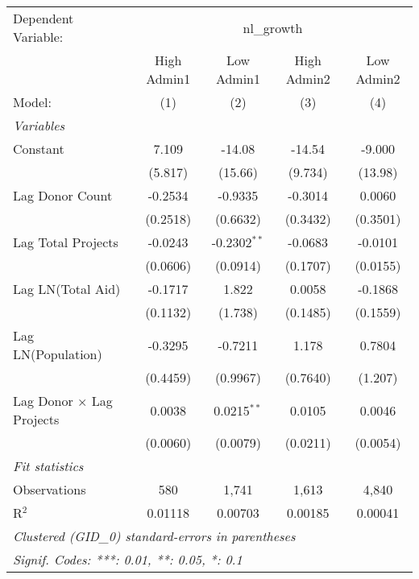 
\begingroup
\centering
\begin{tabular}{lcccc}
   \tabularnewline \midrule \midrule
   Dependent Variable: & \multicolumn{4}{c}{nl\_growth}\\
                            & High Admin1 & Low Admin1     & High Admin2 & Low Admin2 \\   
   Model:                   & (1)         & (2)            & (3)         & (4)\\  
   \midrule
   \emph{Variables}\\
   Constant                 & 7.109       & -14.08         & -14.54      & -9.000\\   
                            & (5.817)     & (15.66)        & (9.734)     & (13.98)\\   
   Lag Donor Count          & -0.2534     & -0.9335        & -0.3014     & 0.0060\\   
                            & (0.2518)    & (0.6632)       & (0.3432)    & (0.3501)\\   
   Lag Total Projects       & -0.0243     & -0.2302$^{**}$ & -0.0683     & -0.0101\\   
                            & (0.0606)    & (0.0914)       & (0.1707)    & (0.0155)\\   
   Lag LN(Total Aid)        & -0.1717     & 1.822          & 0.0058      & -0.1868\\   
                            & (0.1132)    & (1.738)        & (0.1485)    & (0.1559)\\   
   Lag LN(Population)       & -0.3295     & -0.7211        & 1.178       & 0.7804\\   
                            & (0.4459)    & (0.9967)       & (0.7640)    & (1.207)\\   
   Lag Donor × Lag Projects & 0.0038      & 0.0215$^{**}$  & 0.0105      & 0.0046\\   
                            & (0.0060)    & (0.0079)       & (0.0211)    & (0.0054)\\   
   \midrule
   \emph{Fit statistics}\\
   Observations             & 580         & 1,741          & 1,613       & 4,840\\  
   R$^2$                    & 0.01118     & 0.00703        & 0.00185     & 0.00041\\  
   \midrule \midrule
   \multicolumn{5}{l}{\emph{Clustered (GID\_0) standard-errors in parentheses}}\\
   \multicolumn{5}{l}{\emph{Signif. Codes: ***: 0.01, **: 0.05, *: 0.1}}\\
\end{tabular}
\par\endgroup


